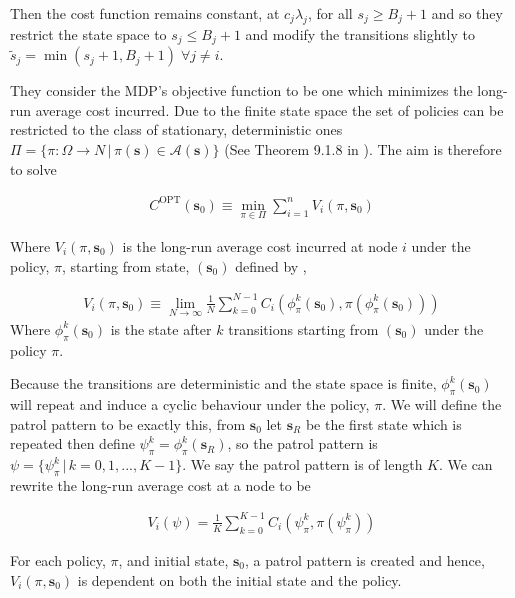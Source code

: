 \documentclass[a4paper,10pt]{article}
\theoremstyle{definition}
\theoremstyle{definition}
\theoremstyle{remark}
\theoremstyle{definition}
\begin{document}
Then the cost function remains constant, at $c_{j} \lambda_{j}$, for all $s_{j} \geq B_{j}+1$ and so they restrict the state space to $s_{j} \leq B_{j}+1$ and modify the transitions slightly to $\widetilde{s}_{j}=\min(s_{j}+1,B_{j}+1) \; \forall j \neq i$.

They consider the MDP's objective function to be one which minimizes the long-run average cost incurred. Due to the finite state space the set of policies can be restricted to the class of stationary, deterministic ones $\Pi= \{\pi: \Omega \rightarrow N \, |\,\pi(\bm{s}) \in \mathcal{A}(\bm{s}) \}$ (See Theorem 9.1.8 in \cite{Puterman1994}). The aim is therefore to solve

\begin{align*}
C^{\text{OPT}}(\bm{s}_{0}) \equiv \min\limits_{\pi \in \Pi} \sum\limits_{i=1}^{n} V_{i}(\pi,\bm{s}_{0})
\end{align*}

Where $V_{i}(\pi,\bm{s}_{0})$ is the long-run average cost incurred at node $i$ under the policy, $\pi$, starting from state, $(\bm{s}_{0})$ defined by ,

\begin{align*}
V_{i}(\pi,\bm{s}_{0}) \equiv \lim\limits_{N \rightarrow \infty} \frac{1}{N} \sum\limits_{k=0}^{N-1} C_{i}(\phi^{k}_{\pi}(\bm{s}_{0}),\pi(\phi^{k}_{\pi}(\bm{s}_{0})))
\end{align*}
Where $\phi^{k}_{\pi}(\bm{s}_{0})$ is the state after $k$ transitions starting from $(\bm{s}_{0})$ under the policy $\pi$.

Because the transitions are deterministic and the state space is finite, $\phi^{k}_{\pi}(\bm{s}_{0})$ will repeat and induce a cyclic behaviour under the policy, $\pi$. We will define the patrol pattern to be exactly this, from $\bm{s}_{0}$ let $\bm{s}_{R}$ be the first state which is repeated then define $\psi^{k}_{\pi}=\phi^{k}_{\pi}(\bm{s}_{R})$, so the patrol pattern is $\psi=\{\psi^{k}_{\pi} \, | \, k=0,1,...,K-1 \}$. We say the patrol pattern is of length $K$. We can rewrite the long-run average cost at a node to be

\begin{align}
\label{Equation:Average long run cost via patrol pattern}
V_{i}(\psi)=\frac{1}{K} \sum\limits_{k=0}^{K-1} C_{i}(\psi^{k}_{\pi},\pi(\psi^{k}_{\pi}))
\end{align}

For each policy, $\pi$, and initial state, $\bm{s}_{0}$, a patrol pattern is created and hence, $V_{i}(\pi,\bm{s}_{0})$ is dependent on both the initial state and the policy.
\end{document}
